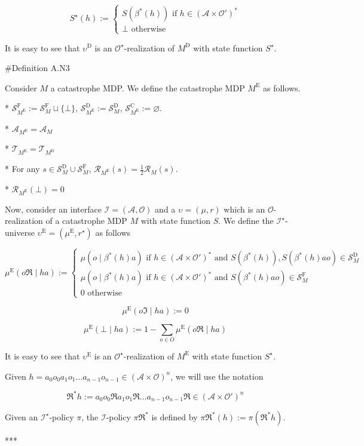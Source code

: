 \documentclass[a4paper]{article}
\newcommand{\AP}[1]{\left(#1\right)}
\newcommand{\Ob}{\mathcal{O}}
\newcommand{\A}{\mathcal{A}}
\newcommand{\St}{\mathcal{S}}
\newcommand{\T}{\mathcal{T}}
\newcommand{\R}{\mathcal{R}}
\newcommand{\In}{\mathcal{I}}
\newcommand{\RMC}{\mathrm{C}}
\newcommand{\RMD}{\mathrm{D}}
\newcommand{\RME}{\mathrm{E}}
\newcommand{\RMF}{\mathrm{F}}
\newcommand{\SF}{\St^{\RMF}}
\newcommand{\SD}{\St^{\RMD}}
\newcommand{\SC}{\St^{\RMC}}
\newcommand{\MD}{M^{\RMD}}
\newcommand{\ME}{M^{\RME}}
\newcommand{\UD}{\upsilon^{\RMD}}
\begin{document}
$$S^\star(h):=\begin{cases} S\AP{\beta^*(h)} \text{ if } h\in\AP{\A \times \Ob'}^* \\ \bot \text{ otherwise} \end{cases}$$

It is easy to see that $\UD$ is an $\Ob^\star$-realization of $\MD$ with state function $S^\star$.

\#Definition A.N3

Consider $M$ a catastrophe MDP. We define the catastrophe MDP $\ME$ as follows.

* $\SF_{\ME}:=\SF_M \sqcup \{\bot\}$, $\SD_{\ME}:=\SD_M$, $\SC_{\ME}:=\varnothing$.

* $\A_{\ME} = \A_M$

* $\T_{\ME} = \T_{\MD}$

* For any $s \in \SD_M \cup \SF_M$, $\R_{\ME}(s) = \frac{1}{2}\R_M(s)$.

* $\R_{\ME}(\bot) = 0$

Now, consider an interface $\In=(\A,\Ob)$ and a $\upsilon=(\mu,r)$ which is an $\Ob$-realization of a catastrophe MDP $M$ with state function $S$. We define the $\In^\star$-universe $\upsilon^\RME=(\mu^\RME,r^\star)$ as follows

$$\mu^\RME(o\Re \mid ha) := \begin{cases} \mu\AP{o \mid \beta^*(h)a} \text{ if } h\in\AP{\A \times \Ob'}^* \text{ and } S\AP{\beta^*(h)},S\AP{\beta^*(h)ao}\in\SD_M \\ \mu\AP{o \mid \beta^*(h)a} \text{ if } h\in\AP{\A \times \Ob'}^* \text{ and } S\AP{\beta^*(h)ao}\in\SF_M \\ 0 \text{ otherwise} \end{cases}$$

$$\mu^\RME(o\Im \mid ha) := 0$$

$$\mu^\RME(\bot \mid ha) := 1 - \sum_{o \in O} \mu^\RME(o\Re \mid ha)$$

It is easy to see that $\upsilon^\RME$ is an $\Ob^\star$-realization of $\ME$ with state function $S^\star$.

Given $h = a_0 o_0 a_1 o_1 \ldots a_{n-1} o_{n-1} \in \AP{\A \times \Ob}^n$, we will use the notation

$$\Re^*h := a_0 o_0 \Re a_1 o_1 \Re \ldots a_{n-1} o_{n-1} \Re \in \AP{\A \times \Ob'}^n$$ 

Given an $\In^\star$-policy $\pi$, the $\In$-policy $\pi\Re^*$ is defined by $\pi\Re^*(h) := \pi\AP{\Re^*h}$.

***
\end{document}
